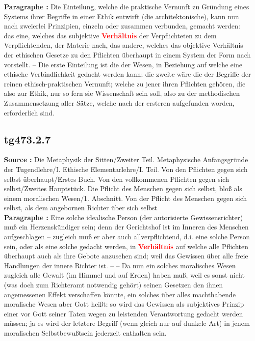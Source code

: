 \documentclass[a4paper,12pt,twoside]{book}
\newcommand{\match}[1]{\textcolor{red}{\textbf{#1}}}
\begin{document}
	\textbf{Paragraphe : }Die Einteilung, welche die praktische Vernunft zu Gründung eines Systems ihrer Begriffe in einer Ethik entwirft (die architektonische), kann nun nach zweierlei Prinzipien, einzeln oder zusammen verbunden, gemacht werden: das eine, welches das subjektive \match{Verhältnis} der Verpflichteten zu dem Verpflichtenden, der Materie nach, das andere, welches das objektive Verhältnis der ethischen Gesetze zu den Pflichten überhaupt in einem System der Form nach vorstellt. – Die erste Einteilung ist die der Wesen, in Beziehung auf welche eine ethische Verbindlichkeit gedacht werden kann; die zweite wäre die der Begriffe der reinen ethisch-praktischen Vernunft; welche zu jener ihren Pflichten gehören, die also zur Ethik, nur so fern sie Wissenschaft sein soll, also zu der methodischen Zusammensetzung aller Sätze, welche nach der ersteren aufgefunden worden, erforderlich sind. 
	
	\subsection*{tg473.2.7} 
	\textbf{Source : }Die Metaphysik der Sitten/Zweiter Teil. Metaphysische Anfangsgründe der Tugendlehre/I. Ethische Elementarlehre/I. Teil. Von den Pflichten gegen sich selbst überhaupt/Erstes Buch. Von den vollkommenen Pflichten gegen sich selbst/Zweites Hauptstück. Die Pflicht des Menschen gegen sich selbst, bloß als einem moralischen Wesen/1. Abschnitt. Von der Pflicht des Menschen gegen sich selbst, als dem angebornen Richter über sich selbst\\  
	
	\textbf{Paragraphe : }Eine solche idealische Person (der autorisierte Gewissensrichter) muß ein Herzenskündiger sein; denn der Gerichtshof ist im Inneren des Menschen aufgeschlagen – zugleich muß er aber auch allverpflichtend, d.i. eine solche Person sein, oder als eine solche gedacht werden, in \match{Verhältnis} auf welche alle Pflichten überhaupt auch als ihre Gebote anzusehen sind; weil das Gewissen über alle freie Handlungen der innere Richter ist. – – Da nun ein solches moralisches Wesen zugleich alle Gewalt (im Himmel und auf Erden) haben muß, weil es sonst nicht (was doch zum Richteramt notwendig gehört) seinen Gesetzen den ihnen angemessenen Effekt verschaffen könnte, ein solches über alles machthabende moralische Wesen aber Gott heißt: so wird das Gewissen als subjektives Prinzip einer vor Gott seiner Taten wegen zu leistenden Verantwortung gedacht werden müssen; ja es wird der letztere Begriff (wenn gleich nur auf dunkele Art) in jenem moralischen Selbstbewußtsein jederzeit enthalten sein. 
	
\end{document}
